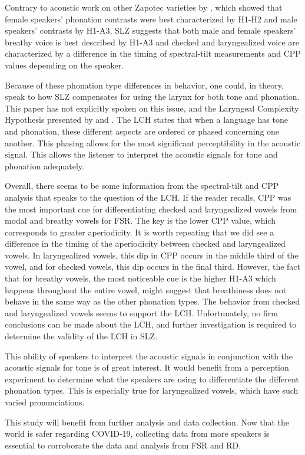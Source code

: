\documentclass[12pt, letterpaper]{article}
\begin{document}
Contrary to acoustic work on other Zapotec varieties by \citet{espositoVariationContrastivePhonation2010}, which showed that female speakers' phonation contrasts were best characterized by H1-H2 and male speakers' contrasts by H1-A3, SLZ suggests that both male and female speakers' breathy voice is best described by H1-A3 and checked and laryngealized voice are characterized by a difference in the timing of spectral-tilt measurements and CPP values depending on the speaker. 

Because of these phonation type differences in behavior, one could, in theory, speak to how SLZ compensates for using the larynx for both tone and phonation. This paper has not explicitly spoken on this issue, and the Laryngeal Complexity Hypothesis presented by \citet{silvermanLaryngealComplexityOtomanguean1997} and \citet{blankenshipTimeCourseBreathiness1997, blankenshipTimingNonmodalPhonation2002}. The LCH states that when a language has tone and phonation, these different aspects are ordered or phased concerning one another. This phasing allows for the most significant perceptibility in the acoustic signal. This allows the listener to interpret the acoustic signals for tone and phonation adequately. 

Overall, there seems to be some information from the spectral-tilt and CPP analysis that speaks to the question of the LCH. If the reader recalls, CPP was the most important cue for differentiating checked and laryngealized vowels from modal and breathy vowels for FSR. The key is the lower CPP value, which corresponds to greater aperiodicity. It is worth repeating that we did see a difference in the timing of the aperiodicity between checked and laryngealized vowels. In laryngealized vowels, this dip in CPP occurs in the middle third of the vowel, and for checked vowels, this dip occurs in the final third. However, the fact that for breathy vowels, the most noticeable cue is the higher H1-A3 which happens throughout the entire vowel, might suggest that breathiness does not behave in the same way as the other phonation types. The behavior from checked and laryngealized vowels seems to support the LCH. Unfortunately, no firm conclusions can be made about the LCH, and further investigation is required to determine the validity of the LCH in SLZ. 

This ability of speakers to interpret the acoustic signals in conjunction with the acoustic signals for tone is of great interest. It would benefit from a perception experiment to determine what the speakers are using to differentiate the different phonation types. This is especially true for laryngealized vowels, which have such varied pronunciations. 

This study will benefit from further analysis and data collection. Now that the world is safer regarding COVID-19, collecting data from more speakers is essential to corroborate the data and analysis from FSR and RD. 


\printbibliography[heading=bibintoc]
\end{document}
